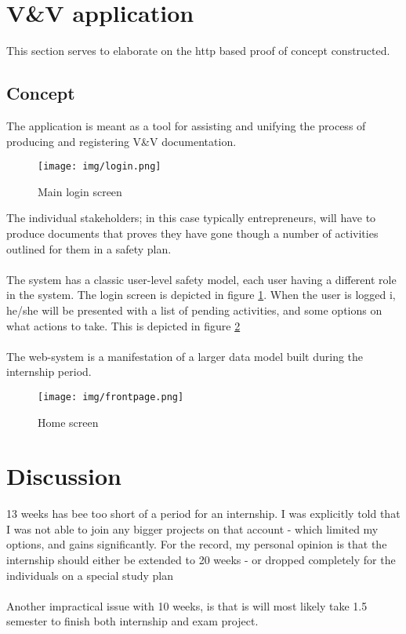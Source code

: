 \documentclass[11pt,a4paper,UKenglish]{article}
\begin{document}
\section{V\&V application}
This section serves to elaborate on the http based proof of concept constructed.
\subsection{Concept}
The application is meant as a tool for assisting and unifying the process of producing and registering V\&V documentation.\\
\begin{figure}[!tbh]
	\centering
	\texttt{[image: img/login.png]}
	\caption{Main login screen}
	\label{fig:login}
\end{figure}
The individual stakeholders; in this case typically entrepreneurs, will have to produce documents that proves they have gone though a number of activities outlined for them in a safety plan.\\\\
The system has a classic user-level safety model, each user having a different role in the system. The login screen is depicted in figure \ref{fig:login}.
When the user is logged i, he/she will be presented with a list of pending activities, and some options on what actions to take. This is depicted in figure \ref{fig:main}\\\\
The web-system is a manifestation of a larger data model built during the internship period.
\begin{figure}[!tbh]
	\centering
	\texttt{[image: img/frontpage.png]}
	\caption{Home screen}
	\label{fig:main}
\end{figure}

\section{Discussion}
13 weeks has bee too short of a period for an internship. I was explicitly told that I was not able to join any bigger projects on that account - which limited my options, and gains significantly. For the record, my personal opinion is that the internship should either be extended to 20 weeks - or dropped completely for the individuals on a special study plan\\\\
Another impractical issue with 10 weeks, is that is will most likely take 1.5 semester to finish both internship and exam project.
\end{document}
